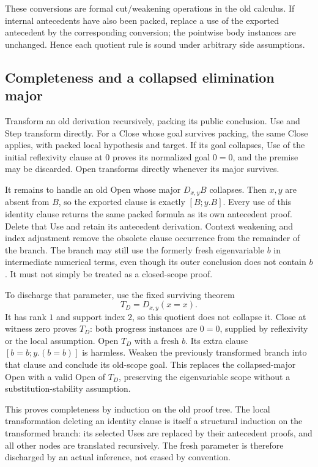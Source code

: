 These conversions are formal cut/weakening operations in the old
calculus. If internal antecedents have also been packed, replace a use
of the exported antecedent by the corresponding conversion; the
pointwise body instances are unchanged. Hence each quotient rule is
sound under arbitrary side assumptions.

\subsection{Completeness and a collapsed elimination major}
Transform an old derivation recursively, packing its public conclusion.
Use and Step transform directly. For a Close whose goal survives
packing, the same Close applies, with packed local hypothesis and
target. If its goal collapses, Use of the initial reflexivity clause
at \(0\) proves its normalized goal \(0=0\), and the premise may be
discarded. Open transforms directly whenever its major survives.

It remains to handle an old Open whose major \(D_{x,y}B\) collapses.
Then \(x,y\) are absent from \(B\), so the exported clause is exactly
\([B;y.B]\). Every use of this identity clause returns the same packed
formula as its own antecedent proof. Delete that Use and retain its
antecedent derivation. Context weakening and index adjustment remove
the obsolete clause occurrence from the remainder of the branch.
The branch may still use the formerly fresh eigenvariable \(b\) in
intermediate numerical terms, even though its outer conclusion does
not contain \(b\). It must not simply be treated as a closed-scope proof.

To discharge that parameter, use the fixed surviving theorem
\[
 T_D=D_{x,y}(x=x).
\]
It has rank \(1\) and support index \(2\), so this quotient does not
collapse it. Close at witness zero proves \(T_D\): both progress
instances are \(0=0\), supplied by reflexivity or the local assumption.
Open \(T_D\) with a fresh \(b\). Its extra clause
\([b=b;y.(b=b)]\) is harmless. Weaken the previously transformed branch
into that clause and conclude its old-scope goal. This replaces the
collapsed-major Open with a valid Open of \(T_D\), preserving the
eigenvariable scope without a substitution-stability assumption.

This proves completeness by induction on the old proof tree. The
local transformation deleting an identity clause is itself a structural
induction on the transformed branch: its selected Uses are replaced by
their antecedent proofs, and all other nodes are translated recursively.
The fresh parameter is therefore discharged by an actual inference,
not erased by convention.

